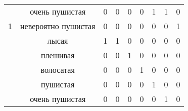 \begin{table}[H]
\begin{tabular}{|c|c|ccccccc|}
		{\color[HTML]{333333} }                                                    & очень пушистая                              & \multicolumn{1}{c|}{{\color[HTML]{333333} 0}} & \multicolumn{1}{c|}{{\color[HTML]{333333} 0}} & \multicolumn{1}{c|}{0}     & \multicolumn{1}{c|}{0}      & \multicolumn{1}{c|}{1}      & \multicolumn{1}{c|}{1}        & \multicolumn{1}{c|}{0}  \\ \cline{2-9}
		\multirow{-6}{*}{{\color[HTML]{333333} 1}}                                 & невероятно пушистая                        & \multicolumn{1}{c|}{{\color[HTML]{333333} 0}} & \multicolumn{1}{c|}{{\color[HTML]{333333} 0}} & \multicolumn{1}{c|}{0}     & \multicolumn{1}{c|}{0}      & \multicolumn{1}{c|}{0}      & \multicolumn{1}{c|}{0}        & \multicolumn{1}{c|}{1}  \\ \cline{1-9}
		{\color[HTML]{333333} }                                                    & лысая                                 & \multicolumn{1}{c|}{1}                        & \multicolumn{1}{c|}{1}                        & \multicolumn{1}{c|}{0}     & \multicolumn{1}{c|}{0}      & \multicolumn{1}{c|}{0}      & \multicolumn{1}{c|}{0}        & \multicolumn{1}{c|}{0}  \\ \cline{2-9}
		{\color[HTML]{333333} }                                                    & плешивая                           & \multicolumn{1}{c|}{{\color[HTML]{333333} 0}} & \multicolumn{1}{c|}{{\color[HTML]{333333} 0}} & \multicolumn{1}{c|}{1}     & \multicolumn{1}{c|}{0}      & \multicolumn{1}{c|}{0}      & \multicolumn{1}{c|}{0}        &      \multicolumn{1}{c|}{0}                 \\ \cline{2-9}
		{\color[HTML]{333333} }                                                    & волосатая                           & \multicolumn{1}{c|}{{\color[HTML]{333333} 0}} & \multicolumn{1}{c|}{{\color[HTML]{333333} 0}} & \multicolumn{1}{c|}{0}     & \multicolumn{1}{c|}{1}      & \multicolumn{1}{c|}{0}      & \multicolumn{1}{c|}{0}        &            \multicolumn{1}{c|}{0}           \\ \cline{2-9}
		{\color[HTML]{333333} }                                                    & пушистая                                    & \multicolumn{1}{c|}{{\color[HTML]{333333} 0}} & \multicolumn{1}{c|}{{\color[HTML]{333333} 0}} & \multicolumn{1}{c|}{0}     & \multicolumn{1}{c|}{0}      & \multicolumn{1}{c|}{1}      & \multicolumn{1}{c|}{0}        & \multicolumn{1}{c|}{0}                       \\ \cline{2-9}
		{\color[HTML]{333333} }                                                    & очень пушистая                              & \multicolumn{1}{c|}{{\color[HTML]{333333} 0}} & \multicolumn{1}{c|}{{\color[HTML]{333333} 0}} & \multicolumn{1}{c|}{0}     & \multicolumn{1}{c|}{0}      & \multicolumn{1}{c|}{0}      & \multicolumn{1}{c|}{1}        & \multicolumn{1}{c|}{0}                       \\ \cline{2-9}

\end{tabular}
\end{table}
